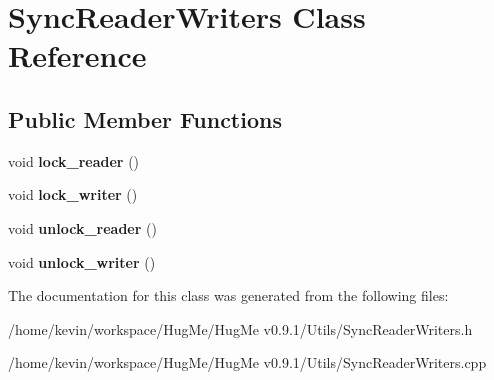 \hypertarget{classSyncReaderWriters}{
\section{SyncReaderWriters Class Reference}
\label{classSyncReaderWriters}
}
\subsection*{Public Member Functions}
\begin{DoxyCompactItemize}
\item 
\hypertarget{classSyncReaderWriters_a140a5fd82984c430d5cf09d8eaedc939}{
void {\bfseries lock\_\-reader} ()}
\label{classSyncReaderWriters_a140a5fd82984c430d5cf09d8eaedc939}

\item 
\hypertarget{classSyncReaderWriters_a0a33621969f1b7dfb1cc3df40b218be0}{
void {\bfseries lock\_\-writer} ()}
\label{classSyncReaderWriters_a0a33621969f1b7dfb1cc3df40b218be0}

\item 
\hypertarget{classSyncReaderWriters_a4edc618bdb3b02014b0dbe2e62ea2444}{
void {\bfseries unlock\_\-reader} ()}
\label{classSyncReaderWriters_a4edc618bdb3b02014b0dbe2e62ea2444}

\item 
\hypertarget{classSyncReaderWriters_af966888ec964ab9ee92460dc49ec1cfe}{
void {\bfseries unlock\_\-writer} ()}
\label{classSyncReaderWriters_af966888ec964ab9ee92460dc49ec1cfe}

\end{DoxyCompactItemize}


The documentation for this class was generated from the following files:\begin{DoxyCompactItemize}
\item 
/home/kevin/workspace/HugMe/HugMe v0.9.1/Utils/SyncReaderWriters.h\item 
/home/kevin/workspace/HugMe/HugMe v0.9.1/Utils/SyncReaderWriters.cpp\end{DoxyCompactItemize}
